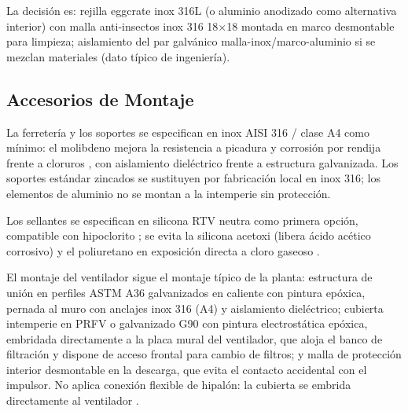 La decisión es: rejilla eggcrate inox 316L (o aluminio anodizado como alternativa interior) con malla anti-insectos inox 316 18$\times$18 montada en marco desmontable para limpieza; aislamiento del par galvánico malla-inox/marco-aluminio si se mezclan materiales (dato típico de ingeniería).

\subsection{Accesorios de Montaje}

La ferretería y los soportes se especifican en inox AISI 316 / clase A4 como mínimo: el molibdeno mejora la resistencia a picadura y corrosión por rendija frente a cloruros \cite{marsh_fasteners}, con aislamiento dieléctrico frente a estructura galvanizada. Los soportes estándar zincados se sustituyen por fabricación local en inox 316; los elementos de aluminio no se montan a la intemperie sin protección.

Los sellantes se especifican en silicona RTV neutra como primera opción, compatible con hipoclorito \cite{rtv_silicone}; se evita la silicona acetoxi (libera ácido acético corrosivo) y el poliuretano en exposición directa a cloro gaseoso \cite{apache_pu}.

El montaje del ventilador sigue el montaje típico de la planta: estructura de unión en perfiles ASTM A36 galvanizados en caliente con pintura epóxica, pernada al muro con anclajes inox 316 (A4) y aislamiento dieléctrico; cubierta intemperie en PRFV o galvanizado G90 con pintura electrostática epóxica, embridada directamente a la placa mural del ventilador, que aloja el banco de filtración y dispone de acceso frontal para cambio de filtros; y malla de protección interior desmontable en la descarga, que evita el contacto accidental con el impulsor. No aplica conexión flexible de hipalón: la cubierta se embrida directamente al ventilador \cite{hardcast_hypalon}.
